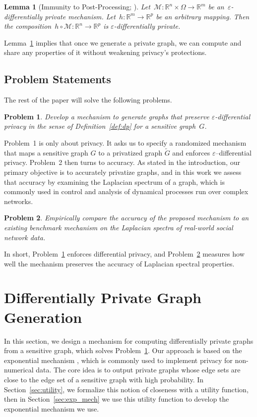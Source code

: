 \documentclass[conference]{ieeeconf}
\newtheorem{lemma}{Lemma}
\newtheorem{problem}{Problem}
\newcommand{\M}{\mathcal{M}}
\begin{document}
\begin{lemma}[{Immunity to Post-Processing; \cite[Section 2.3]{dwork2014algorithmic}}]\label{lemma:immunity}
    Let~$\M:\mathbb{R}^n \times \Omega \rightarrow \mathbb{R}^m$ be an~$\varepsilon$-differentially private mechanism. Let~$h:\mathbb{R}^m \rightarrow \mathbb{R}^p$ be an arbitrary mapping. Then the composition~$h \circ \M:\mathbb{R}^n \to \mathbb{R}^p$ is $\varepsilon$-differentially private.
\end{lemma}

Lemma~\ref{lemma:immunity} implies that once we generate a private graph, we can compute and share any properties of it without weakening privacy's protections.

\subsection{Problem Statements}
The rest of the paper will solve the following problems. 

\begin{problem}\label{prob:1}
    Develop a mechanism to generate graphs that preserve $\varepsilon$-differential privacy in the sense of Definition~\ref{def:dp} for a sensitive graph~$G$.
\end{problem}

Problem~1 is only about privacy. It asks us to specify a randomized mechanism that maps a sensitive graph $G$ to a privatized 
graph $\widetilde G$ and enforces $\varepsilon$–differential privacy. 
Problem~2 then turns to accuracy. As stated in the introduction, our primary objective is to accurately privatize 
graphs, and in this work we assess that accuracy by examining
the Laplacian spectrum of a graph, which is commonly used in control 
and analysis of dynamical processes run over complex networks. 


\begin{problem}\label{prob:3}
    Empirically compare the accuracy of the proposed mechanism to an existing benchmark mechanism on the Laplacian spectra of real-world social network data.
\end{problem}

 In short, Problem~\ref{prob:1} enforces differential privacy, and Problem~\ref{prob:3} measures how well the mechanism preserves
 the accuracy of Laplacian spectral properties.


\section{Differentially Private Graph Generation}\label{sec:III}
In this section, we design a mechanism for computing differentially private graphs from a sensitive graph, which solves Problem~\ref{prob:1}. 
Our approach is based on the exponential mechanism \cite{mcsherry2007mechanism}, which is 
commonly used to implement privacy for non-numerical data.
The core idea is to output private graphs whose edge sets are close to the edge set of a sensitive graph with high probability.
In Section~\ref{sec:utility}, we formalize this notion of closeness with a utility function, then in Section~\ref{sec:exp_mech} we use this utility function 
to develop the exponential mechanism we use.
\end{document}
